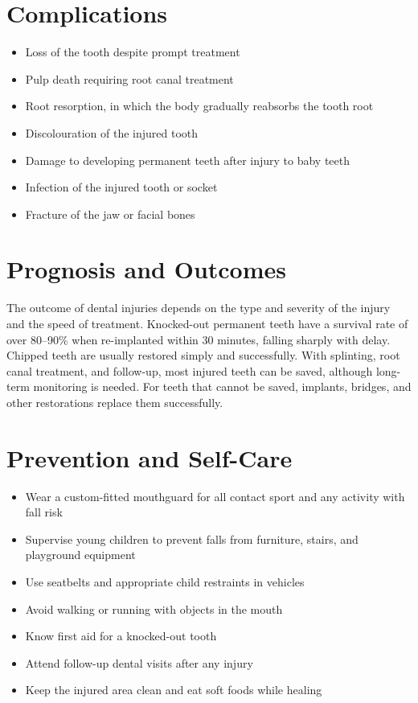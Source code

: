 \section*{Complications}
\begin{itemize}
    \item Loss of the tooth despite prompt treatment
    \item Pulp death requiring root canal treatment
    \item Root resorption, in which the body gradually reabsorbs the tooth root
    \item Discolouration of the injured tooth
    \item Damage to developing permanent teeth after injury to baby teeth
    \item Infection of the injured tooth or socket
    \item Fracture of the jaw or facial bones
\end{itemize}

\section*{Prognosis and Outcomes}
The outcome of dental injuries depends on the type and severity of the injury and the speed of treatment. Knocked-out permanent teeth have a survival rate of over 80--90\% when re-implanted within 30 minutes, falling sharply with delay. Chipped teeth are usually restored simply and successfully. With splinting, root canal treatment, and follow-up, most injured teeth can be saved, although long-term monitoring is needed. For teeth that cannot be saved, implants, bridges, and other restorations replace them successfully.

\section*{Prevention and Self-Care}
\begin{itemize}
    \item Wear a custom-fitted mouthguard for all contact sport and any activity with fall risk
    \item Supervise young children to prevent falls from furniture, stairs, and playground equipment
    \item Use seatbelts and appropriate child restraints in vehicles
    \item Avoid walking or running with objects in the mouth
    \item Know first aid for a knocked-out tooth
    \item Attend follow-up dental visits after any injury
    \item Keep the injured area clean and eat soft foods while healing
\end{itemize}


